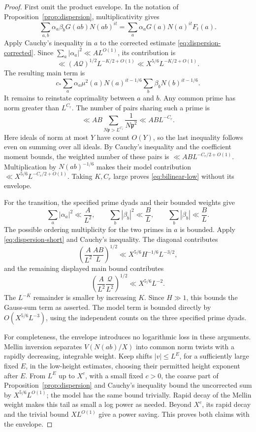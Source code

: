 \begin{proof}
First omit the product envelope. In the notation of
Proposition~\ref{prop:dispersion}, multiplicativity gives
\[
 \sum_{a,b}\alpha_a\beta_bG(ab)N(ab)^{it}
   =\sum_a\alpha_aG(a)N(a)^{it}F_t(a).
\]
Apply Cauchy's inequality in \(a\) to the corrected estimate
\eqref{eq:dispersion-corrected}. Since
\(\sum_a|\alpha_a|^2\ll AL^{O(1)}\), its contribution is
\[
 \ll (A\mathcal Q)^{1/2}L^{-K/2+O(1)}
 \ll X^{5/6}L^{-K/2+O(1)}.
\]
The resulting main term is
\[
 c_*\sum_a\alpha_a\mu^2(a)N(a)^{it-1/6}
       \sum_b\beta_bN(b)^{it-1/6}.
\]
It remains to reinstate coprimality between \(a\) and \(b\).
Any common prime has norm greater than \(L^{C_r}\). The number of
pairs sharing such a prime is
\[
 \ll AB\sum_{N\mathfrak p>L^{C_r}}\frac1{N\mathfrak p^2}
 \ll AB L^{-C_r}.
\]
Here ideals of norm at most \(Y\) have count \(O(Y)\), so the last
inequality follows even on summing over all ideals. By Cauchy's
inequality and the coefficient moment bounds, the weighted number of
these pairs is \(\ll AB L^{-C_r/2+O(1)}\). Multiplication by
\(N(ab)^{-1/6}\) makes their model contribution
\(\ll X^{5/6}L^{-C_r/2+O(1)}\). Taking \(K,C_r\) large proves
\eqref{eq:bilinear-low} without its envelope.

For the transition, the specified prime dyads and their bounded weights
give
\[
 \sum_a|\alpha_a|^2\ll\frac A{L^2},\qquad
 \sum_b|\beta_b|^2\ll\frac BL,\qquad
 \sum_b|\beta_b|\ll\frac BL.
\]
The possible ordering multiplicity for the two primes in \(a\) is
bounded. Apply \eqref{eq:dispersion-short} and Cauchy's inequality.
The diagonal contributes
\[
 \left(\frac A{L^2}\frac{AB}L\right)^{1/2}
 \ll X^{5/6}H^{-1/6}L^{-3/2},
\]
and the remaining displayed main bound contributes
\[
 \left(\frac A{L^2}\frac{\mathcal Q}{L^2}\right)^{1/2}
 \ll X^{5/6}L^{-2}.
\]
The \(L^{-K}\) remainder is smaller by increasing \(K\).
Since \(H\gg1\), this bounds the Gauss-sum term as asserted.
The model term is bounded directly by
\(O(X^{5/6}L^{-3})\), using the independent counts on the three
specified prime dyads.

For completeness, the envelope introduces no logarithmic loss in these
arguments. Mellin inversion separates \(V(N(ab)/X)\) into common norm
twists with a rapidly decreasing, integrable weight. Keep shifts
\(|v|\le L^E\), for a sufficiently large fixed \(E\), in the
low-height estimates, choosing their permitted height exponent after
\(E\). From \(L^E\) up to \(X^c\), with a small fixed \(c>0\), the
coarse part of Proposition~\ref{prop:dispersion} and Cauchy's inequality
bound the uncorrected sum by \(X^{5/6}L^{O(1)}\); the model has the
same bound trivially. Rapid decay of the Mellin weight makes this tail
as small a log power as needed. Beyond \(X^c\), its rapid decay and
the trivial bound \(XL^{O(1)}\) give a power saving. This proves both
claims with the envelope.
\end{proof}

